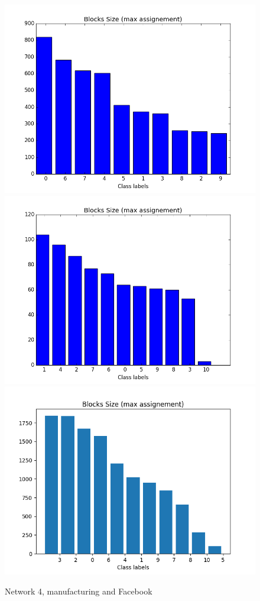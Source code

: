 \begin{figure}[ht]
	\endminipage
		\vspace{-0.28cm}
	\includegraphics[scale=0.27]{img/expe/4_ibp/figure_3}
	\endminipage
	\includegraphics[scale=0.27]{img/expe/5_ibp/figure_3} 
	\endminipage
	\includegraphics[scale=0.27]{img/expe/6_ibp/figure_3}
	\endminipage
    \caption{Network 4, manufacturing and Facebook}

\end{figure}
